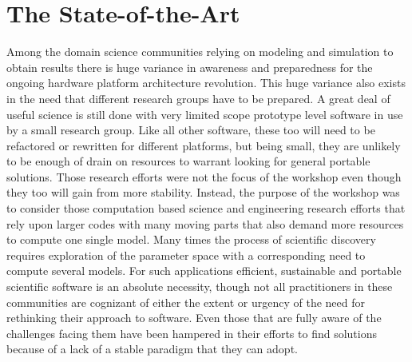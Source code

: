 \section{The State-of-the-Art}

Among the domain science communities relying on modeling and
simulation to obtain results there is huge variance in awareness and
preparedness for the ongoing hardware platform architecture
revolution. This huge variance also exists in the need that different
research groups have to be prepared. A great deal of useful science is
still done with very limited scope prototype level software in
use by a small research group. Like all other software, these too will
need to be refactored or rewritten for different platforms, but being
small, they are unlikely to be enough of drain on resources to warrant
looking for general portable solutions. Those research efforts were
not the focus of the workshop even though they too will gain from more
stability. Instead, the purpose of the workshop was to consider those
computation based science and engineering research efforts that rely
upon larger codes with many moving parts that also  demand more
resources to compute one single model. Many times the process of
scientific discovery requires exploration of the parameter space with
a corresponding need to compute several models. For such applications
efficient, sustainable and portable scientific software is an absolute
necessity, though not all practitioners in these communities are
cognizant of either the extent or urgency of the need for rethinking
their approach to software. Even those that are fully aware of the
challenges facing them have been hampered in  their efforts to find
solutions because of a lack of a stable paradigm that they can adopt.   

